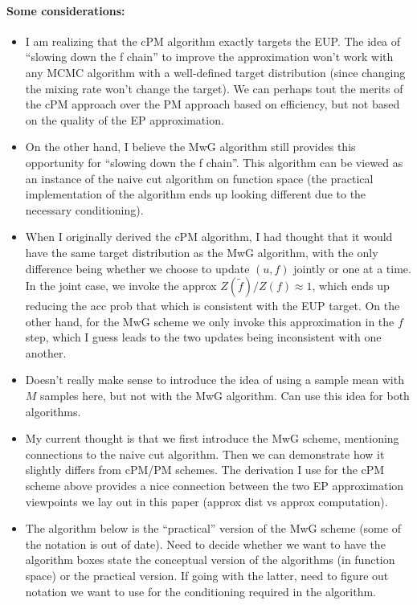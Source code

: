 \documentclass[12pt]{article}
\begin{document}
\vspace 

\paragraph{Some considerations:}
\begin{itemize}
\item I am realizing that the cPM algorithm exactly targets the EUP. The idea of ``slowing down the f chain'' to improve
the approximation won't work with any MCMC algorithm with a well-defined target distribution (since changing the mixing
rate won't change the target). We can perhaps tout the merits of the cPM approach over the PM approach based on
efficiency, but not based on the quality of the EP approximation.
\item On the other hand, I believe the MwG algorithm still provides this opportunity for ``slowing down the f chain''.
This algorithm can be viewed as an instance of the naive cut algorithm on function space (the practical implementation of
the algorithm ends up looking different due to the necessary conditioning).
\item When I originally derived the cPM algorithm, I had thought that it would have the same target distribution
as the MwG algorithm, with the only difference being whether we choose to update $(u,f)$ jointly or one at
a time. In the joint case, we invoke the approx $Z(\tilde{f})/Z(f) \approx 1$, which ends up reducing the acc prob
that which is consistent with the EUP target. On the other hand, for the MwG scheme we only invoke this approximation 
in the $f$ step, which I guess leads to the two updates being inconsistent with one another.
\item Doesn't really make sense to introduce the idea of using a sample mean with $M$ samples here, but not with the
MwG algorithm. Can use this idea for both algorithms.
\item My current thought is that we first introduce the MwG scheme, mentioning connections to the naive cut algorithm.
Then we can demonstrate how it slightly differs from cPM/PM schemes. The derivation I use for the cPM scheme above
provides a nice connection between the two EP approximation viewpoints we lay out in this paper 
(approx dist vs approx computation).
\item The algorithm below is the ``practical'' version of the MwG scheme (some of the notation is out of date). Need
to decide whether we want to have the algorithm boxes state the conceptual version of the algorithms (in function space)
or the practical version. If going with the latter, need to figure out notation we want to use for the conditioning required
in the algorithm.
\end{itemize}
\end{document}
